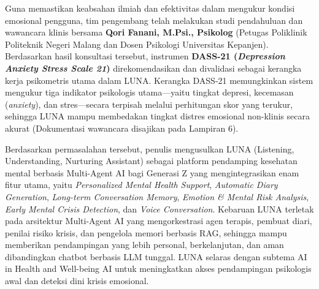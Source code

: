 Guna memastikan keabsahan ilmiah dan efektivitas dalam mengukur kondisi emosional pengguna, tim pengembang telah melakukan studi pendahuluan dan wawancara klinis bersama \textbf{Qori Fanani, M.Psi., Psikolog} (Petugas Poliklinik Politeknik Negeri Malang dan Dosen Psikologi Universitas Kepanjen). Berdasarkan hasil konsultasi tersebut, instrumen \textbf{DASS-21 (\textit{Depression Anxiety Stress Scale 21})} direkomendasikan dan divalidasi sebagai kerangka kerja psikometris utama dalam LUNA. Kerangka DASS-21 memungkinkan sistem mengukur tiga indikator psikologis utama—yaitu tingkat depresi, kecemasan (\textit{anxiety}), dan stres—secara terpisah melalui perhitungan skor yang terukur, sehingga LUNA mampu membedakan tingkat distres emosional non-klinis secara akurat (Dokumentasi wawancara disajikan pada Lampiran 6).

Berdasarkan permasalahan tersebut, penulis mengusulkan LUNA (Listening, Understanding, Nurturing Assistant) sebagai platform pendamping kesehatan mental berbasis Multi-Agent AI bagi Generasi Z yang mengintegrasikan enam fitur utama, yaitu \textit{Personalized Mental Health Support}, \textit{Automatic Diary Generation}, \textit{Long-term Conversation Memory}, \textit{Emotion \& Mental Risk Analysis}, \textit{Early Mental Crisis Detection}, dan \textit{Voice Conversation}. Kebaruan LUNA terletak pada arsitektur Multi-Agent AI yang mengorkestrasi agen terapis, pembuat diari, penilai risiko krisis, dan pengelola memori berbasis RAG, sehingga mampu memberikan pendampingan yang lebih personal, berkelanjutan, dan aman dibandingkan chatbot berbasis LLM tunggal. LUNA selaras dengan subtema AI in Health and Well-being AI untuk meningkatkan akses pendampingan psikologis awal dan deteksi dini krisis emosional.
